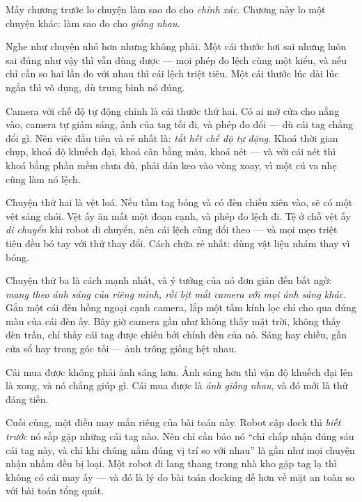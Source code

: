 \documentclass[../../marker.tex]{subfiles}
\begin{document}
\begin{dongian}
Mấy chương trước lo chuyện làm sao đo cho \emph{chính xác}. Chương này lo một chuyện khác: làm sao đo cho \emph{giống nhau}.

Nghe như chuyện nhỏ hơn nhưng không phải. Một cái thước hơi sai nhưng luôn sai đúng như vậy thì vẫn dùng được --- mọi phép đo lệch cùng một kiểu, và nếu chỉ cần so hai lần đo với nhau thì cái lệch triệt tiêu. Một cái thước lúc dài lúc ngắn thì vô dụng, dù trung bình nó đúng.

Camera với chế độ tự động chính là cái thước thứ hai. Có ai mở cửa cho nắng vào, camera tự giảm sáng, ảnh của tag tối đi, và phép đo đổi --- dù cái tag chẳng đổi gì. Nên việc đầu tiên và rẻ nhất là: \emph{tắt hết chế độ tự động}. Khoá thời gian chụp, khoá độ khuếch đại, khoá cân bằng màu, khoá nét --- và với cái nét thì khoá bằng phần mềm chưa đủ, phải dán keo vào vòng xoay, vì một cú va nhẹ cũng làm nó lệch.

Chuyện thứ hai là vệt loá. Nếu tấm tag bóng và có đèn chiếu xiên vào, sẽ có một vệt sáng chói. Vệt ấy ăn mất một đoạn cạnh, và phép đo lệch đi. Tệ ở chỗ vệt ấy \emph{di chuyển} khi robot di chuyển, nên cái lệch cũng đổi theo --- và mọi mẹo triệt tiêu đều bó tay với thứ thay đổi. Cách chữa rẻ nhất: dùng vật liệu nhám thay vì bóng.

Chuyện thứ ba là cách mạnh nhất, và ý tưởng của nó đơn giản đến bất ngờ: \emph{mang theo ánh sáng của riêng mình, rồi bịt mắt camera với mọi ánh sáng khác}. Gắn một cái đèn hồng ngoại cạnh camera, lắp một tấm kính lọc chỉ cho qua đúng màu của cái đèn ấy. Bây giờ camera gần như không thấy mặt trời, không thấy đèn trần, chỉ thấy cái tag được chiếu bởi chính đèn của nó. Sáng hay chiều, gần cửa sổ hay trong góc tối --- ảnh trông giống hệt nhau.

Cái mua được không phải ảnh sáng hơn. Ảnh sáng hơn thì vặn độ khuếch đại lên là xong, và nó chẳng giúp gì. Cái mua được là \emph{ảnh giống nhau}, và đó mới là thứ đáng tiền.

Cuối cùng, một điều may mắn riêng của bài toán này. Robot cập dock thì \emph{biết trước} nó sắp gặp những cái tag nào. Nên chỉ cần bảo nó ``chỉ chấp nhận đúng sáu cái tag này, và chỉ khi chúng nằm đúng vị trí so với nhau'' là gần như mọi chuyện nhận nhầm đều bị loại. Một robot đi lang thang trong nhà kho gặp tag lạ thì không có cái may ấy --- và đó là lý do bài toán docking dễ hơn về mặt an toàn so với bài toán tổng quát.

\end{dongian}
\end{document}
